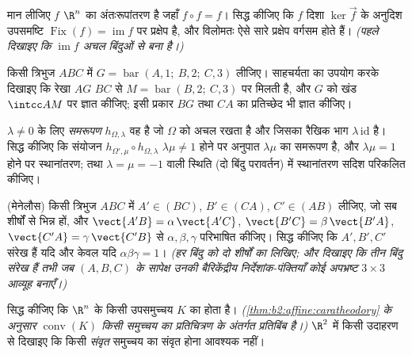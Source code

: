 \begin{exercise}[$\star\star\star$]\label{exo:b2:affine:8}
मान लीजिए $f$ $\R^n$ का  अंतःरूपांतरण है जहाँ $f \circ f = f$। सिद्ध कीजिए कि $f$
दिशा $\ker\vec f$ के अनुदिश  उपसमष्टि $\operatorname{Fix}(f) = \operatorname{im} f$ पर  प्रक्षेप है, और विलोमतः ऐसे
सारे प्रक्षेप वर्गसम होते हैं। \emph{(पहले दिखाइए कि $\operatorname{im} f$ अचल बिंदुओं से
बना है।)}
\end{exercise}

\begin{exercise}[$\star$]\label{exo:b2:affine:9}
किसी त्रिभुज $ABC$ में $G = \operatorname{bar}(A, 1;\ B, 2;\ C, 3)$ लीजिए। साहचर्यता का उपयोग करके दिखाइए कि रेखा $AG$
$BC$ से $M = \operatorname{bar}(B, 2;\ C, 3)$ पर मिलती है, और $G$ को खंड $\intcc AM$ पर ज्ञात कीजिए; इसी प्रकार $BG$
तथा $CA$ का प्रतिच्छेद भी ज्ञात कीजिए।
\end{exercise}

\begin{exercise}[$\star\star$]\label{exo:b2:affine:10}
$\lambda \neq 0$ के लिए \emph{समरूपण} $h_{\Omega,
\lambda}$ वह  है जो $\Omega$ को अचल रखता है
और जिसका रैखिक भाग $\lambda\,\mathrm{id}$ है। सिद्ध कीजिए कि संयोजन $h_{\Omega', \mu} \circ h_{\Omega, \lambda}$ $\lambda\mu \neq 1$ होने पर अनुपात
$\lambda\mu$ का समरूपण है, और $\lambda\mu = 1$ होने पर स्थानांतरण; तथा $\lambda = \mu = -1$ वाली स्थिति (दो बिंदु
परावर्तन) में स्थानांतरण सदिश परिकलित कीजिए।
\end{exercise}

\begin{exercise}[$\star\star$]\label{exo:b2:affine:11}
(मेनेलौस) किसी त्रिभुज $ABC$ में $A' \in (BC)$, $B' \in
(CA)$, $C' \in (AB)$ लीजिए, जो सब शीर्षों से भिन्न
हों, और $\vect{A'B} =
\alpha\,\vect{A'C}$, $\vect{B'C} = \beta\,\vect{B'A}$, $\vect{C'A} = \gamma\,\vect{C'B}$ से $\alpha, \beta, \gamma$ परिभाषित कीजिए। सिद्ध कीजिए कि $A', B', C'$ संरेख हैं
यदि और केवल यदि $\alpha\beta\gamma = 1$। \emph{(हर बिंदु को दो शीर्षों का  लिखिए;
और दिखाइए कि तीन बिंदु संरेख हैं तभी जब $(A, B, C)$ के सापेक्ष उनकी बैरिकेंद्रीय
निर्देशांक-पंक्तियाँ कोई अपभ्रष्ट $3 \times 3$ आव्यूह बनाएँ।)}
\end{exercise}

\begin{exercise}[$\star\star\star$]\label{exo:b2:affine:12}
सिद्ध कीजिए कि $\R^n$ के किसी  उपसमुच्चय $K$ का   होता है।
\emph{(\cref{thm:b2:affine:caratheodory} के अनुसार $\operatorname{conv}(K)$ किसी  समुच्चय का  प्रतिचित्रण के अंतर्गत
प्रतिबिंब है।)} $\R^2$ में किसी उदाहरण से दिखाइए कि किसी \emph{संवृत} समुच्चय
का  संवृत होना आवश्यक नहीं।
\end{exercise}


